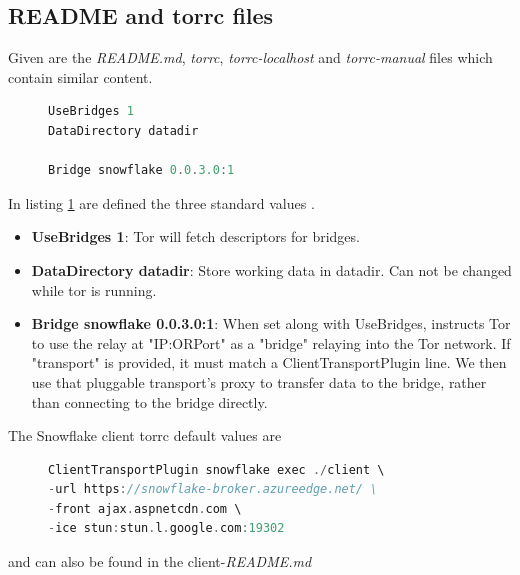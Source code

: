 \documentclass{amsart}
\theoremstyle{definition}
\theoremstyle{remark}
\numberwithin{equation}{section}
\begin{document}
\subsection{README and torrc files}
\label{ss:clientreadmeandtorrcfiles}
Given are the \textit{README.md}, \textit{torrc}, \textit{torrc-localhost} and \textit{torrc-manual} files which contain similar content.

\begin{figure}[H]
\begin{lstlisting}[frame=single, language=C, caption=torrc-Config: Standard values]
UseBridges 1
DataDirectory datadir

Bridge snowflake 0.0.3.0:1
\end{lstlisting}
\label{fig:torrcconfigstandardvalues}
\end{figure}

In listing \ref{fig:torrcconfigstandardvalues} are defined the three standard values \cite{TorStableManual}.
\begin{itemize}
    \item \textbf{UseBridges 1}: Tor will fetch descriptors for bridges.
    \item \textbf{DataDirectory datadir}: Store working data in datadir. Can not be changed while tor is running.
    \item \textbf{Bridge snowflake 0.0.3.0:1}: When set along with UseBridges, instructs Tor to use the relay at "IP:ORPort" as a "bridge" relaying into the Tor network. If "transport" is provided, it must match a ClientTransportPlugin line. We then use that pluggable transport’s proxy to transfer data to the bridge, rather than connecting to the bridge directly.
\end{itemize}

The Snowflake client torrc default values are

\begin{figure}[H]
\begin{lstlisting}[frame=single, language=C, caption=torrc-Config: Snowflake client default values]
ClientTransportPlugin snowflake exec ./client \
-url https://snowflake-broker.azureedge.net/ \
-front ajax.aspnetcdn.com \
-ice stun:stun.l.google.com:19302
\end{lstlisting}
\label{fig:torrcconfigsnowflakeclientdefault}
\end{figure}

and can also be found in the client-\textit{README.md} \cite{SnowflakeGitClient}
\end{document}
